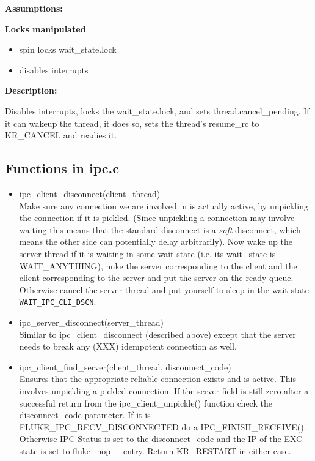 \textbf{Assumptions:}

\textbf{Locks manipulated}
\begin{itemize}
  \item spin locks wait_state.lock
  \item disables interrupts
\end{itemize}

\textbf{Description:}

Disables interrupts, locks the wait_state.lock, and sets
thread.cancel_pending. If it can wakeup the thread, it does
so, sets the thread's resume_rc to KR_CANCEL and readies it.

\subsection{Functions in ipc.c}
\begin{itemize}
\item ipc_client_disconnect(client_thread)\\ 
Make sure any connection we are involved in is actually active, by
unpickling the connection if it is pickled. (Since unpickling a
connection may involve waiting this means that the standard disconnect
is a {\it soft} disconnect, which means the other side can potentially
delay arbitrarily). Now wake up the server thread if it is waiting in
some wait state (i.e. its wait_state is WAIT_ANYTHING), nuke the
server corresponding to the client and the client corresponding to the
server and put the server on
the ready queue. Otherwise
cancel the server thread and put yourself to sleep in the wait state
{\tt WAIT_IPC_CLI_DSCN}. 

\item ipc_server_disconnect(server_thread)\\ 
Similar to ipc_client_disconnect (described above) except that 
the server needs to break any (XXX) idempotent connection as well.

\item ipc_client_find_server(client_thread, disconnect_code)\\ 
Ensures that the appropriate reliable connection exists and is
active. This involves unpickling a pickled connection. If the server
field is still zero after a successful return from the
ipc_client_unpickle() function check the disconnect_code parameter. If
it is FLUKE_IPC_RECV_DISCONNECTED do a IPC_FINISH_RECEIVE().
Otherwise IPC Status is set to the disconnect_code and the IP of the
EXC state is set to fluke_nop__entry. Return KR_RESTART in either
case.


\end{itemize}
